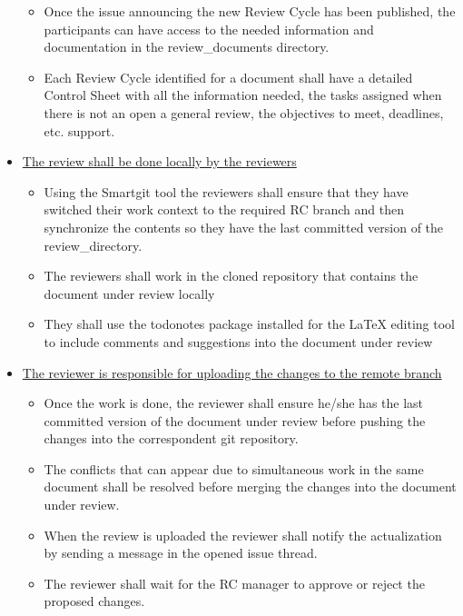 \documentclass{template/openetcs_article}
\begin{document}
\begin{itemize}
\begin{itemize}
\item Once the issue announcing the new Review Cycle has been published, the participants can have access to the needed information and documentation in the review\_documents directory.
\item Each Review Cycle identified for a document shall have a detailed Control Sheet with all the information needed, the tasks assigned when there is not an open a general review, the objectives to meet, deadlines, etc. support.
\end{itemize}

\item \underline{The review shall be done locally by the reviewers}
\begin{itemize}
\item Using the Smartgit tool the reviewers shall ensure that they have switched their work context to the required RC branch and then synchronize the contents so they have the last committed version of the review\_directory.
\item The reviewers shall work in the cloned repository that contains the document under review locally 
\item They shall use the todonotes package installed for the LaTeX editing tool to include comments and suggestions into the document under review
\end{itemize}

\item \underline{The reviewer is responsible for uploading the changes to the remote branch}
\begin{itemize}
\item Once the work is done, the reviewer shall ensure he/she has the last committed version of the document under review before pushing the changes into the correspondent git repository. 
\item The conflicts that can appear due to simultaneous work in the same document shall be resolved before merging the changes into the document under review. 
\item When the review is uploaded the reviewer shall notify the actualization by sending a message in the opened issue thread.
\item The reviewer shall wait for the RC manager to approve or reject the proposed changes.
\end{itemize}


\end{itemize}
\end{document}
